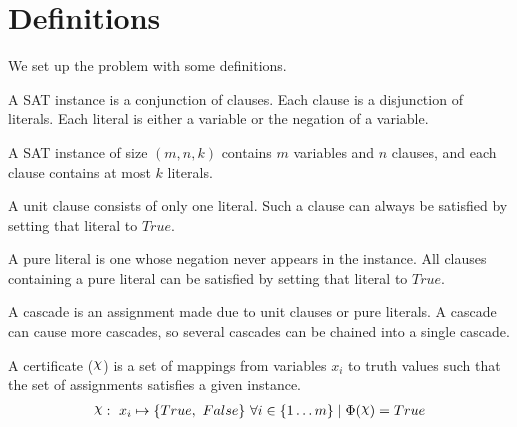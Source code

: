 \section{Definitions}
\label{sec:definitions}

We set up the problem with some definitions.


\begin{definition}
\label{def:instance}
    A SAT instance is a conjunction of clauses.
    Each clause is a disjunction of literals.
    Each literal is either a variable or the negation of a variable.
\end{definition}

\begin{definition}[Size]
\label{def:size}
    A SAT instance of size $(m, n, k)$ contains $m$ variables and $n$ clauses, and each clause contains at most $k$ literals.
\end{definition}

\begin{definition}
\label{def:unit-clause}
    A unit clause consists of only one literal.
    Such a clause can always be satisfied by setting that literal to $True$.
\end{definition}

\begin{definition}
\label{def:pure-literal}
    A pure literal is one whose negation never appears in the instance.
    All clauses containing a pure literal can be satisfied by setting that literal to $True$.
\end{definition}

\begin{definition}[Cascade]
\label{def:cascade}
    A cascade is an assignment made due to unit clauses or pure literals.
    A cascade can cause more cascades, so several cascades can be chained into a single cascade.
\end{definition}

\begin{definition}[Certificate]
\label{def:certificate}
    A certificate ($\rchi$) is a set of mappings from variables $x_i$ to truth values such that the set of assignments satisfies a given instance.
    \begin{align*}
        \rchi :~ x_i \mapsto \{ True,~ False \}~ \forall i \in \{ 1 \ldots m \}
        \mid \Phi(\rchi) = True
    \end{align*}
\end{definition}

